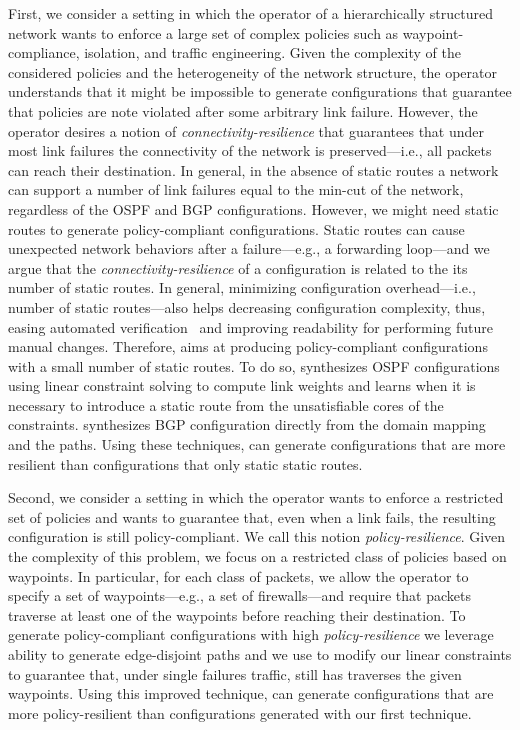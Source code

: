 First, we consider a setting in which the operator 
of a hierarchically structured network
wants to 
enforce a large set of complex policies such as waypoint-compliance, isolation, and traffic engineering.
Given the complexity of the considered policies and the heterogeneity of the network structure,
the operator understands that it might be impossible to generate configurations
that guarantee that policies are note violated after some arbitrary link failure.
However, the operator desires a notion of \emph{connectivity-resilience} that 
guarantees that under most link failures the connectivity of the network is preserved---i.e.,
all packets can reach their destination.
In general, in the absence of static routes a network can support
a number of link failures equal to the min-cut of the network, regardless
of the OSPF and BGP configurations.
However, we might need static routes to generate policy-compliant configurations.
Static routes can cause unexpected network behaviors after a failure---e.g., a forwarding loop---and
we argue that the \emph{connectivity-resilience} of a configuration is related to the its number of static routes.
In general, minimizing configuration overhead---i.e., number of static routes---also helps decreasing configuration complexity, 
thus, easing automated
verification~\cite{batfish, arc, era} and improving readability for
performing future manual changes.
Therefore, \name aims at producing policy-compliant configurations with a small number of static routes.
To do so, \name synthesizes OSPF configurations using linear constraint solving to compute
link weights and  learns when it is necessary to introduce a static route from the unsatisfiable cores of the constraints.
\name synthesizes BGP configuration directly from the domain mapping and the paths.
Using these techniques, \name can generate configurations that are
 more resilient than configurations that only static static routes.

Second, we consider a setting in which the operator 
wants to 
enforce a restricted set of policies and wants to guarantee
that, even when a link fails, the resulting configuration is still policy-compliant.
We call this notion \emph{policy-resilience}.
Given the complexity of this problem, we focus on a restricted class of policies
based on waypoints.
In particular, for each class of packets, we allow the operator to specify a set of waypoints---e.g.,
a set of firewalls---and require that packets traverse at least one of the waypoints before reaching their destination.
To generate policy-compliant configurations with high \emph{policy-resilience} we leverage \genesis ability to 
generate edge-disjoint paths and we use to modify our linear constraints
to guarantee that, under single failures traffic, still has traverses the given waypoints. 
Using this improved technique, \name can generate configurations that are
 more policy-resilient than configurations generated with our first technique.


